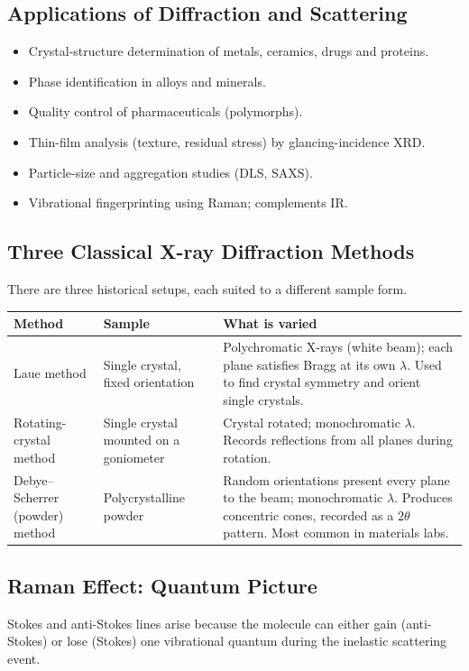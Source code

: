\documentclass[12pt,a4paper]{article}
\begin{document}
\subsection{Applications of Diffraction and Scattering}
\begin{itemize}[leftmargin=*, itemsep=2pt, topsep=2pt]
  \item Crystal-structure determination of metals, ceramics, drugs and proteins.
  \item Phase identification in alloys and minerals.
  \item Quality control of pharmaceuticals (polymorphs).
  \item Thin-film analysis (texture, residual stress) by glancing-incidence XRD.
  \item Particle-size and aggregation studies (DLS, SAXS).
  \item Vibrational fingerprinting using Raman; complements IR.
\end{itemize}

\subsection{Three Classical X-ray Diffraction Methods}
There are three historical setups, each suited to a different sample form.

\begin{tabularx}{\linewidth}{|B{2.6cm}|Y|Y|}
\hline
\textbf{Method} & \textbf{Sample} & \textbf{What is varied} \\
\hline
Laue method & Single crystal, fixed orientation & Polychromatic X-rays (white beam); each plane satisfies Bragg at its own $\lambda$. Used to find crystal symmetry and orient single crystals. \\
\hline
Rotating-crystal method & Single crystal mounted on a goniometer & Crystal rotated; monochromatic $\lambda$. Records reflections from all planes during rotation. \\
\hline
Debye--Scherrer (powder) method & Polycrystalline powder & Random orientations present every plane to the beam; monochromatic $\lambda$. Produces concentric cones, recorded as a $2\theta$ pattern. Most common in materials labs. \\
\hline
\end{tabularx}

\subsection{Raman Effect: Quantum Picture}
Stokes and anti-Stokes lines arise because the molecule can either gain (anti-Stokes) or lose (Stokes) one vibrational quantum during the inelastic scattering event.
\end{document}
